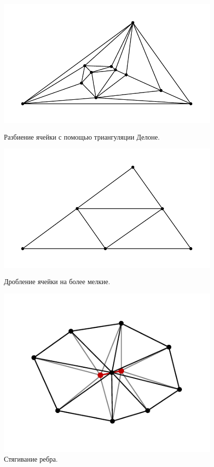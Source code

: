 \begin{figure}
  \centering
  \begin{minipage}[h]{0.35\textwidth}
    \includegraphics[width=\textwidth]{pics/pic_delaunay_size.pdf}
    \caption{Разбиение ячейки с помощью триангуляции Делоне.}\label{fig:pic_delaunay}
  \end{minipage}
  \hfill
  \begin{minipage}[h]{0.35\textwidth}
    \includegraphics[width=\textwidth]{pics/pic_delaunay_2_size.pdf}
    \caption{Дробление ячейки на более мелкие.}\label{fig:pic_delaunay_2}
  \end{minipage}
  \hfill
  \begin{minipage}[h]{0.28\textwidth}
    \includegraphics[width=\textwidth]{pics/pic_reduce_edge_size.pdf}
    \caption{Стягивание ребра.}\label{fig:pic_reduce_edge}
  \end{minipage}
\end{figure}
